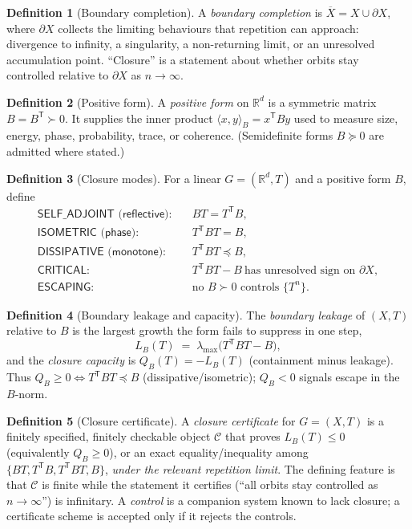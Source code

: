 \documentclass[11pt]{article}
\theoremstyle{definition}
\newtheorem{definition}{Definition}
\theoremstyle{plain}
\theoremstyle{remark}
\newcommand{\T}{\mathsf{T}}
\newcommand{\trp}{^{\!\T}}
\begin{document}
\begin{definition}[Boundary completion]\label{def:bdy}
A \emph{boundary completion} is $\overline X = X\cup\partial X$, where $\partial X$
collects the limiting behaviours that repetition can approach: divergence to infinity,
a singularity, a non-returning limit, or an unresolved accumulation point. ``Closure''
is a statement about whether orbits stay controlled relative to $\partial X$ as
$n\to\infty$.
\end{definition}

\begin{definition}[Positive form]\label{def:form}
A \emph{positive form} on $\mathbb R^d$ is a symmetric matrix $B=B\trp\succ 0$. It
supplies the inner product $\langle x,y\rangle_B = x\trp B y$ used to measure size,
energy, phase, probability, trace, or coherence. (Semidefinite forms $B\succeq 0$ are
admitted where stated.)
\end{definition}

\begin{definition}[Closure modes]\label{def:modes}
For a linear $G=(\mathbb R^d,T)$ and a positive form $B$, define
\[
\begin{aligned}
\textsf{SELF\_ADJOINT (reflective):}&\quad BT = T\trp B,\\
\textsf{ISOMETRIC (phase):}&\quad T\trp B T = B,\\
\textsf{DISSIPATIVE (monotone):}&\quad T\trp B T \preceq B,\\
\textsf{CRITICAL:}&\quad T\trp B T - B \ \text{has unresolved sign on } \partial X,\\
\textsf{ESCAPING:}&\quad \text{no } B\succ 0 \text{ controls } \{T^n\}.
\end{aligned}
\]
\end{definition}

\begin{definition}[Boundary leakage and capacity]\label{def:leak}
The \emph{boundary leakage} of $(X,T)$ relative to $B$ is the largest growth the form
fails to suppress in one step,
\[
L_B(T) \;=\; \lambda_{\max}\!\big(T\trp B T - B\big),
\]
and the \emph{closure capacity} is $Q_B(T) = -L_B(T)$ (containment minus leakage).
Thus $Q_B\ge 0 \Leftrightarrow T\trp BT\preceq B$ (dissipative/isometric); $Q_B<0$
signals escape in the $B$-norm.
\end{definition}

\begin{definition}[Closure certificate]\label{def:cert}
A \emph{closure certificate} for $G=(X,T)$ is a finitely specified, finitely checkable
object $\mathcal C$ that proves $L_B(T)\le 0$ (equivalently $Q_B\ge 0$), or an exact
equality/inequality among $\{BT,T\trp B,T\trp BT,B\}$, \emph{under the relevant
repetition limit}. The defining feature is that $\mathcal C$ is finite while the
statement it certifies (``all orbits stay controlled as $n\to\infty$'') is infinitary.
A \emph{control} is a companion system known to lack closure; a certificate scheme is
accepted only if it rejects the controls.
\end{definition}
\end{document}
